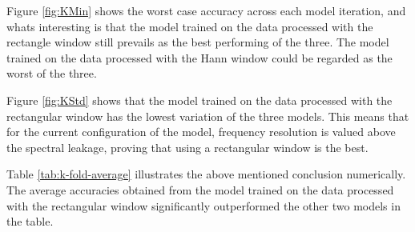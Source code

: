 \documentclass[class=report,11pt,crop=false]{standalone}
\begin{document}
Figure \ref{fig:KMin} shows the worst case accuracy across each model iteration, and whats interesting is that the model trained on the data processed with the rectangle window still prevails as the best performing of the three. The model trained on the data processed with the Hann window could be regarded as the worst of the three. 

Figure \ref{fig:KStd} shows that the model trained on the data processed with the rectangular window has the lowest variation of the  three models. This means that for the current configuration of the model, frequency resolution is valued above the spectral leakage, proving that using a rectangular window is the best. 

Table \ref{tab:k-fold-average} illustrates the above mentioned conclusion numerically. The average accuracies obtained from the model trained on the data processed with the rectangular window significantly outperformed the other two models in the table. 

\ifstandalone

\printnoidxglossary[type=\acronymtype,nonumberlist]
\fi
\end{document}

